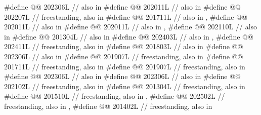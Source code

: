 \begin{codeblock}
#define @@          202306L // also in 
#define @@                        202011L // also in 
#define @@                 202207L // freestanding, also in 
#define @@                  201711L // also in , 
#define @@                       202011L // also in 
#define @@                   202011L // also in , 
#define @@       202110L // also in 
#define @@                       201304L // also in 
#define @@                       202403L // also in , 
#define @@                         202411L // freestanding, also in 
#define @@                           201803L // also in 
#define @@                     202306L // also in 
#define @@              201907L // freestanding, also in 
#define @@                        201711L // freestanding, also in 
#define @@                          201907L // freestanding, also in 
#define @@                          202306L // also in 
#define @@                         202306L // also in 
#define @@                     202102L // freestanding, also in 
#define @@      201304L // freestanding, also in 
#define @@             201510L
  // freestanding, also in , 
#define @@             202502L
  // freestanding, also in , 
#define @@                   201402L // freestanding, also in 

\end{codeblock}
